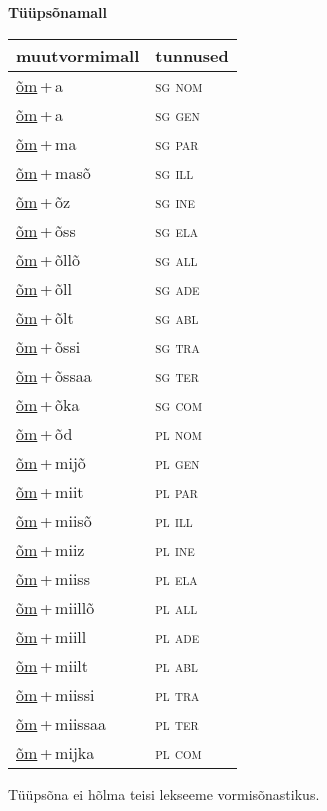 
\vspace{1.8em}
\begin{minipage}{\textwidth}
\textbf{Tüüpsõnamall \,}\\

\begin{sideways}
\begin{tabular}{l l}
muutvormimall & tunnused \\
\hline
\underline{õm}\,+\,a & \textsc{ sg nom } \\
\underline{õm}\,+\,a & \textsc{ sg gen } \\
\underline{õm}\,+\,ma & \textsc{ sg par } \\
\underline{õm}\,+\,masõ & \textsc{ sg ill } \\
\underline{õm}\,+\,õz & \textsc{ sg ine } \\
\underline{õm}\,+\,õss & \textsc{ sg ela } \\
\underline{õm}\,+\,õllõ & \textsc{ sg all } \\
\underline{õm}\,+\,õll & \textsc{ sg ade } \\
\underline{õm}\,+\,õlt & \textsc{ sg abl } \\
\underline{õm}\,+\,õssi & \textsc{ sg tra } \\
\underline{õm}\,+\,õssaa & \textsc{ sg ter } \\
\underline{õm}\,+\,õka & \textsc{ sg com } \\
\underline{õm}\,+\,õd & \textsc{ pl nom } \\
\underline{õm}\,+\,mijõ & \textsc{ pl gen } \\
\underline{õm}\,+\,miit & \textsc{ pl par } \\
\underline{õm}\,+\,miisõ & \textsc{ pl ill } \\
\underline{õm}\,+\,miiz & \textsc{ pl ine } \\
\underline{õm}\,+\,miiss & \textsc{ pl ela } \\
\underline{õm}\,+\,miillõ & \textsc{ pl all } \\
\underline{õm}\,+\,miill & \textsc{ pl ade } \\
\underline{õm}\,+\,miilt & \textsc{ pl abl } \\
\underline{õm}\,+\,miissi & \textsc{ pl tra } \\
\underline{õm}\,+\,miissaa & \textsc{ pl ter } \\
\underline{õm}\,+\,mijka & \textsc{ pl com } \\
\end{tabular}
\end{sideways}
\label{tab:tüüpsõnamall-õma}

\end{minipage}

 
\vspace{1em}
\noindent Tüüpsõna ei hõlma teisi lekseeme vormi\-sõnastikus.
